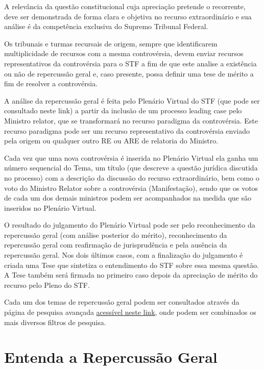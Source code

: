 \documentclass[
]{book}
\begin{document}
A relevância da questão constitucional cuja apreciação pretende o recorrente, deve ser demonstrada de forma clara e objetiva no recurso extraordinário e sua análise é da competência exclusiva do Supremo Tribunal Federal.

Os tribunais e turmas recursais de origem, sempre que identificarem multiplicidade de recursos com a mesma controvérsia, devem enviar recursos representativos da controvérsia para o STF a fim de que este analise a existência ou não de repercussão geral e, caso presente, possa definir uma tese de mérito a fim de resolver a controvérsia.

A análise da repercussão geral é feita pelo Plenário Virtual do STF (que pode ser consultado neste link) a partir da inclusão de um processo leading case pelo Ministro relator, que se transformará no recurso paradigma da controvérsia. Este recurso paradigma pode ser um recurso representativo da controvérsia enviado pela origem ou qualquer outro RE ou ARE de relatoria do Ministro.

Cada vez que uma nova controvérsia é inserida no Plenário Virtual ela ganha um número sequencial do Tema, um título (que descreve a questão jurídica discutida no processo) com a descrição da discussão do recurso extraordinário, bem como o voto do Ministro Relator sobre a controvérsia (Manifestação), sendo que os votos de cada um dos demais ministros podem ser acompanhados na medida que são inseridos no Plenário Virtual.

O resultado do julgamento do Plenário Virtual pode ser pelo reconhecimento da repercussão geral (com análise posterior do mérito), reconhecimento da repercussão geral com reafirmação de jurisprudência e pela ausência da repercussão geral. Nos dois últimos casos, com a finalização do julgamento é criada uma Tese que sintetiza o entendimento do STF sobre essa mesma questão. A Tese também será firmada no primeiro caso depois da apreciação de mérito do recurso pelo Pleno do STF.

Cada um dos temas de repercussão geral podem ser consultados através da página de pesquisa avançada \href{http://portal.stf.jus.br/jurisprudenciaRepercussao/pesquisarProcesso.asp}{acessível neste link}, onde podem ser combinados os mais diversos filtros de pesquisa.

\hypertarget{entenda-a-repercussuxe3o-geral}{%
\section{Entenda a Repercussão Geral}\label{entenda-a-repercussuxe3o-geral}}
\end{document}

